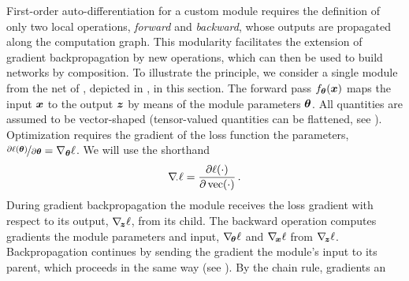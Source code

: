 First-order auto-differentiation for a custom module requires the definition of
only two local operations, \emph{forward} and \emph{backward}, whose outputs are
propagated along the computation graph. This modularity facilitates the
extension of gradient backpropagation by new operations, which can then be used
to build networks by composition. To illustrate the principle, we consider a
single module from the net of , depicted in
, in this section. The forward pass
$f_{{\bm{\theta}}}({\bm{x}})$ maps the input ${\bm{x}}$ to the output ${\bm{z}}$ by means of the
module parameters ${\bm{\theta}}$. All quantities are assumed to be vector-shaped
(tensor-valued quantities can be flattened, see
). Optimization requires the gradient of the
loss function \wrt the parameters, $\nicefrac{\partial \ell({\bm{\theta}})}{\partial
  {\bm{\theta}}} = \nabla_{{\bm{\theta}}}\ell$. We will use the shorthand%
\begin{align}
  \nabla_{\!{\cdot}}\ell = \frac{\partial \ell(\cdot)}{\partial \operatorname{vec}(\cdot)}\,.
\end{align}
During gradient backpropagation the module receives the loss gradient with
respect to its output, $\nabla_{\!{{\bm{z}}}}\ell$, from its child. The backward operation
computes gradients \wrt the module parameters and input, $\nabla_{\!{{\bm{\theta}}}}\ell$
and $\nabla_{\!{{\bm{x}}}} \ell$ from $\nabla_{\!{{\bm{z}}}}\ell$. Backpropagation continues by
sending the gradient \wrt the module's input to its parent, which proceeds in
the same way (see ). By the chain rule, gradients \wrt an
